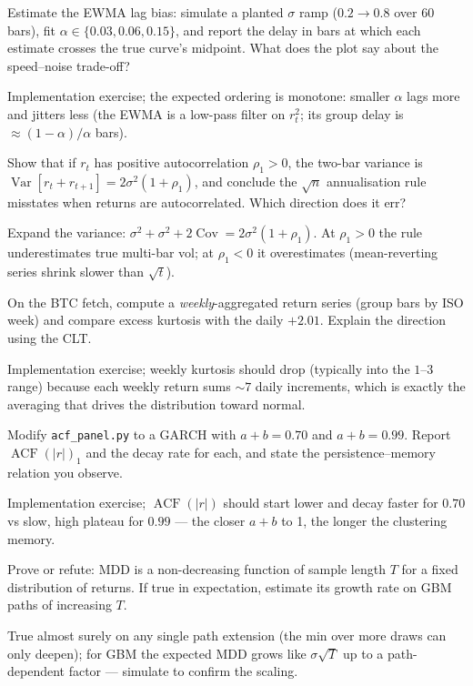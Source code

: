 \begin{exercise}[hard]
Estimate the EWMA lag bias: simulate a planted $\sigma$ ramp
($0.2\to0.8$ over 60 bars), fit $\alpha\in\{0.03,0.06,0.15\}$, and
report the delay in bars at which each estimate crosses the true
curve's midpoint. What does the plot say about the speed--noise
trade-off?
\end{exercise}
\begin{solution}
Implementation exercise; the expected ordering is monotone: smaller
$\alpha$ lags more and jitters less (the EWMA is a low-pass filter on
$r_t^2$; its group delay is $\approx(1-\alpha)/\alpha$ bars).
\end{solution}
\begin{exercise}[hard]
Show that if $r_t$ has positive autocorrelation $\rho_1>0$, the
two-bar variance is $\operatorname{Var}[r_t+r_{t+1}]
=2\sigma^2(1+\rho_1)$, and conclude the $\sqrt n$ annualisation rule
misstates when returns are autocorrelated. Which direction does it
err?
\end{exercise}
\begin{solution}
Expand the variance: $\sigma^2+\sigma^2+2\operatorname{Cov}=2\sigma^2
(1+\rho_1)$. At $\rho_1>0$ the rule underestimates true multi-bar
vol; at $\rho_1<0$ it overestimates (mean-reverting series shrink
slower than $\sqrt t$).
\end{solution}
\begin{exercise}[hard]
On the BTC fetch, compute a \emph{weekly}-aggregated return series
(group bars by ISO week) and compare excess kurtosis with the daily
$+2.01$. Explain the direction using the CLT.
\end{exercise}
\begin{solution}
Implementation exercise; weekly kurtosis should drop (typically into
the $1$--$3$ range) because each weekly return sums $\sim7$ daily
increments, which is exactly the averaging that drives the
distribution toward normal.
\end{solution}
\begin{exercise}[hard]
Modify \texttt{acf\_panel.py} to a GARCH with $a+b=0.70$ and
$a+b=0.99$. Report $\operatorname{ACF}(|r|)_1$ and the decay rate for
each, and state the persistence--memory relation you observe.
\end{exercise}
\begin{solution}
Implementation exercise; $\operatorname{ACF}(|r|)$ should start
lower and decay faster for $0.70$ vs slow, high plateau for $0.99$
--- the closer $a+b$ to 1, the longer the clustering memory.
\end{solution}
\begin{exercise}[hard]
Prove or refute: $\mathrm{MDD}$ is a non-decreasing function of
sample length $T$ for a fixed distribution of returns. If true in
expectation, estimate its growth rate on GBM paths of increasing
$T$.
\end{exercise}
\begin{solution}
True almost surely on any single path extension (the min over more
draws can only deepen); for GBM the expected MDD grows like
$\sigma\sqrt{T}$ up to a path-dependent factor --- simulate to
confirm the scaling.
\end{solution}

